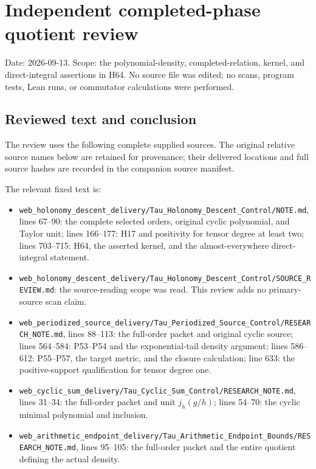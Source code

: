 \section{Independent completed-phase quotient review}\label{independent-completed-phase-quotient-review}

Date: 2026-09-13. Scope: the polynomial-density, completed-relation, kernel, and direct-integral assertions in H64. No source file was edited; no scans, program tests, Lean runs, or commutator calculations were performed.

\subsection{Reviewed text and conclusion}\label{reviewed-text-and-conclusion}

The review uses the following complete supplied sources. The original relative source names below are retained for provenance; their delivered locations and full source hashes are recorded in the companion source manifest.

The relevant fixed text is:

\begingroup\raggedright
\begin{itemize}
\tightlist
\item
  \nolinkurl{web_holonomy_descent_delivery/Tau_Holonomy_Descent_Control/NOTE.md}, lines 67--90: the complete selected orders, original cyclic polynomial, and Taylor unit; lines 166--177: H17 and positivity for tensor degree at least two; lines 703--715: H64, the asserted kernel, and the almost-everywhere direct-integral statement.
\item
  \nolinkurl{web_holonomy_descent_delivery/Tau_Holonomy_Descent_Control/SOURCE_REVIEW.md}: the source-reading scope was read. This review adds no primary-source scan claim.
\item
  \nolinkurl{web_periodized_source_delivery/Tau_Periodized_Source_Control/RESEARCH_NOTE.md}, lines 88--113: the full-order packet and original cyclic source; lines 564--584: P53--P54 and the exponential-tail density argument; lines 586--612: P55--P57, the target metric, and the closure calculation; line 633: the positive-support qualification for tensor degree one.
\item
  \nolinkurl{web_cyclic_sum_delivery/Tau_Cyclic_Sum_Control/RESEARCH_NOTE.md}, lines 31--34: the full-order packet and unit \(j_h(g/h)\); lines 54--70: the cyclic minimal polynomial and inclusion.
\item
  \nolinkurl{web_arithmetic_endpoint_delivery/Tau_Arithmetic_Endpoint_Bounds/RESEARCH_NOTE.md}, lines 95--105: the full-order packet and the entire quotient defining the actual density.
\end{itemize}
\endgroup

